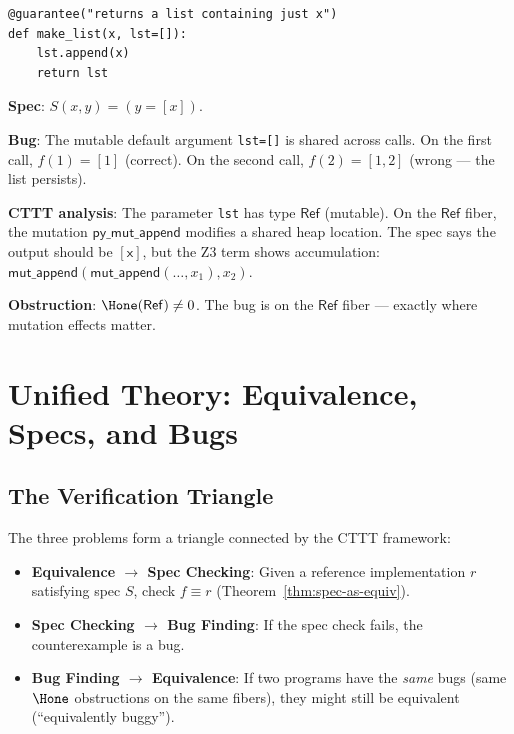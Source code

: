 \begin{lstlisting}[caption={Mutable default argument}]
@guarantee("returns a list containing just x")
def make_list(x, lst=[]):
    lst.append(x)
    return lst
\end{lstlisting}

\textbf{Spec}: $S(x, y) = (y = [x])$.

\textbf{Bug}: The mutable default argument \texttt{lst=[]} is shared
across calls.  On the first call, $f(1) = [1]$ (correct).  On the
second call, $f(2) = [1, 2]$ (wrong --- the list persists).

\textbf{CTTT analysis}: The parameter \texttt{lst} has type
$\mathsf{Ref}$ (mutable).  On the $\mathsf{Ref}$ fiber, the
mutation $\mathsf{py\_mut\_append}$ modifies a shared heap location.
The spec says the output should be $[\mathsf{x}]$, but the Z3 term
shows accumulation: $\mathsf{mut\_append}(\mathsf{mut\_append}(\ldots,
x_1), x_2)$.

\textbf{Obstruction}: $\Hone(\mathsf{Ref}) \neq 0$.  The bug is on
the $\mathsf{Ref}$ fiber --- exactly where mutation effects matter.


\chapter{Unified Theory: Equivalence, Specs, and Bugs}
\label{ch:unified}

\section{The Verification Triangle}

The three problems form a triangle connected by the CTTT framework:

\begin{center}
\end{center}

\begin{itemize}
  \item \textbf{Equivalence $\to$ Spec Checking}: Given a reference
    implementation $r$ satisfying spec $S$, check $f \equiv r$
    (Theorem~\ref{thm:spec-as-equiv}).
  \item \textbf{Spec Checking $\to$ Bug Finding}: If the spec check
    fails, the counterexample is a bug.
  \item \textbf{Bug Finding $\to$ Equivalence}: If two programs have
    the \emph{same} bugs (same $\Hone$ obstructions on the same
    fibers), they might still be equivalent (``equivalently buggy'').
\end{itemize}

